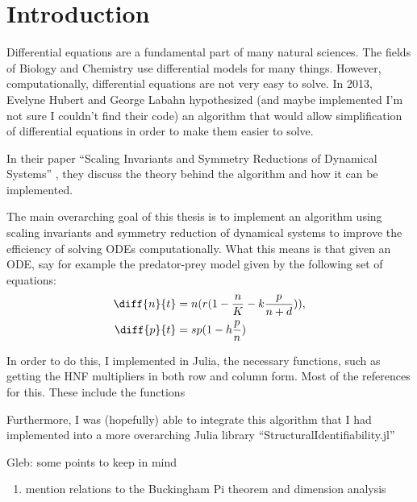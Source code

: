 \documentclass[oneside, a4paper, onecolumn, 11pt]{article}
\begin{document}
\newpage
\tableofcontents
\newpage


\section{Introduction}

Differential equations are a fundamental part of many natural sciences. The fields of Biology and Chemistry use differential models for many things. However, computationally, differential equations are not very easy to solve. In 2013, Evelyne Hubert and George Labahn hypothesized (and maybe implemented I'm not sure I couldn't find their code) an algorithm that would allow simplification of differential equations in order to make them easier to solve.

In their paper ``Scaling Invariants and Symmetry Reductions of Dynamical Systems'' \cite{Hubert2013}, they discuss the theory behind the algorithm and how it can be implemented.

The main overarching goal of this thesis is to implement an algorithm using scaling invariants and symmetry reduction of dynamical systems to improve the efficiency of solving ODEs computationally. What this means is that given an ODE, say for example the predator-prey model given by the following set of equations:
\begin{align*}
    \diff{n}{t}
     & = n (r (1 - \frac{n}{K} - k \frac{p}{n + d})), \\
    \diff{p}{t}
     & = sp (1 - h \frac{p}{n})
\end{align*}

In order to do this, I implemented in Julia, the necessary functions, such as getting the HNF multipliers in both row and column form. Most of the references for this. These include the functions \cite{Hubert2013}

Furthermore, I was (hopefully) able to integrate this algorithm that I had implemented into a more overarching Julia library ``StructuralIdentifiability.jl''

{\color{purple}Gleb: some points to keep in mind
\begin{enumerate}
  \item mention relations to the Buckingham Pi theorem and dimension analysis
\end{enumerate}

}

\end{document}
